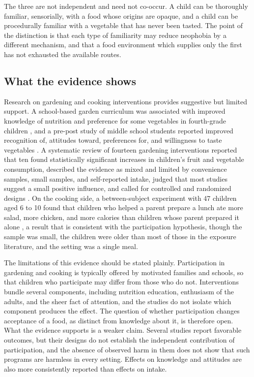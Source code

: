 \documentclass[11pt]{article}
\theoremstyle{remark}
\begin{document}
The three are not independent and need not co-occur. A child can be thoroughly familiar, sensorially, with a food whose origins are opaque, and a child can be procedurally familiar with a vegetable that has never been tasted. The point of the distinction is that each type of familiarity may reduce neophobia by a different mechanism, and that a food environment which supplies only the first has not exhausted the available routes.

\subsection{What the evidence shows}

Research on gardening and cooking interventions provides suggestive but limited support. A school-based garden curriculum was associated with improved knowledge of nutrition and preference for some vegetables in fourth-grade children \citep{morris2002garden}, and a pre-post study of middle school students reported improved recognition of, attitudes toward, preferences for, and willingness to taste vegetables \citep{ratcliffe2011effects}. A systematic review of fourteen gardening interventions reported that ten found statistically significant increases in children's fruit and vegetable consumption, described the evidence as mixed and limited by convenience samples, small samples, and self-reported intake, judged that most studies suggest a small positive influence, and called for controlled and randomized designs \citep{savoierosko2017increasing}. On the cooking side, a between-subject experiment with 47 children aged 6 to 10 found that children who helped a parent prepare a lunch ate more salad, more chicken, and more calories than children whose parent prepared it alone \citep{vanderhorst2014involving}, a result that is consistent with the participation hypothesis, though the sample was small, the children were older than most of those in the exposure literature, and the setting was a single meal.

The limitations of this evidence should be stated plainly. Participation in gardening and cooking is typically offered by motivated families and schools, so that children who participate may differ from those who do not. Interventions bundle several components, including nutrition education, enthusiasm of the adults, and the sheer fact of attention, and the studies do not isolate which component produces the effect. The question of whether participation changes acceptance of a food, as distinct from knowledge about it, is therefore open. What the evidence supports is a weaker claim. Several studies report favorable outcomes, but their designs do not establish the independent contribution of participation, and the absence of observed harm in them does not show that such programs are harmless in every setting. Effects on knowledge and attitudes are also more consistently reported than effects on intake.
\end{document}
